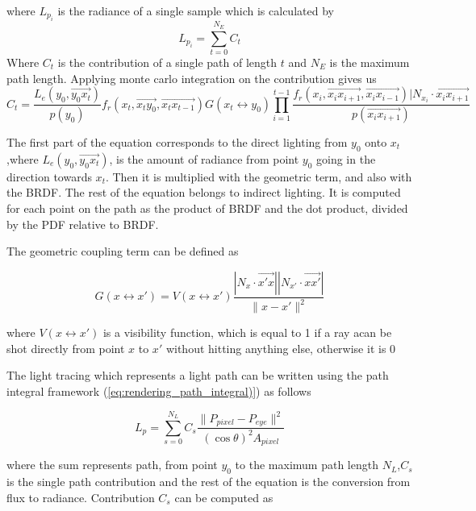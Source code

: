 \documentclass[11pt, a4paper]{article}
\begin{document}
where $L_{p_i}$ is the radiance of a single sample which is calculated by 
\begin{equation}
    L_{p_i} = \sum_{t=0}^{N_E}C_t
\end{equation}
Where $C_t$ is the contribution of a single path of length $t$ and $N_E$ is the maximum path length. Applying monte carlo integration on the contribution gives us
\begin{equation}\label{eq:pathtracer}
    C_t = \frac{L_e(y_0,\overrightarrow{y_0x_t})}{p(y_0)}f_r(x_t,\overrightarrow{x_ty_0},\overrightarrow{x_tx_{t-1}})G(x_t \leftrightarrow y_0) \prod_{i=1}^{t-1}\frac{f_r(x_i,\overrightarrow{x_ix_{i+1}},\overrightarrow{x_ix_{i-1}}) | N_{x_i} \cdot \overrightarrow{x_ix_{i+1}}}{p(\overrightarrow{x_ix_{i+1}})}
\end{equation}

The first part of the equation corresponds to the direct lighting from $y_0$ onto  $x_t$,where $L_e(y_0,\overrightarrow{y_0x_t})$, is the amount of radiance from point $y_0$ going in the direction towards $x_t$. Then it is multiplied with the geometric term, and also with the BRDF. The rest of the equation belongs to indirect lighting. It is computed for each point on the path as the product of BRDF and the dot product, divided by the PDF relative to BRDF. 

The geometric coupling term can be defined as 

\begin{equation}
    G(x \leftrightarrow x') = V(x \leftrightarrow x') \frac{|N_x \cdot \overrightarrow{x'x}||N_{x'} \cdot \overrightarrow{xx'}|}{\|x-x'\|^2}
\end{equation}

where $V(x \leftrightarrow x')$ is a visibility function, which is equal to 1 if a ray acan be shot directly from point $x$ to $x'$ without hitting anything else, otherwise it is 0

The light tracing which represents a light path can be written using the path integral framework (\ref{eq:rendering_path_integral)}) as follows

\begin{equation}
    L_p = \sum_{s=0}^{N_L}C_s \frac {\|P_{pixel} - P_{eye} \|^2}{(\cos{\theta})^2A_{pixel}}
\end{equation}

where the sum represents path, from point $y_0$ to the maximum path length $N_L$,$C_s$ is the single path contribution and the rest of the equation is the conversion from flux to radiance. Contribution $C_s$ can be computed as
\end{document}
